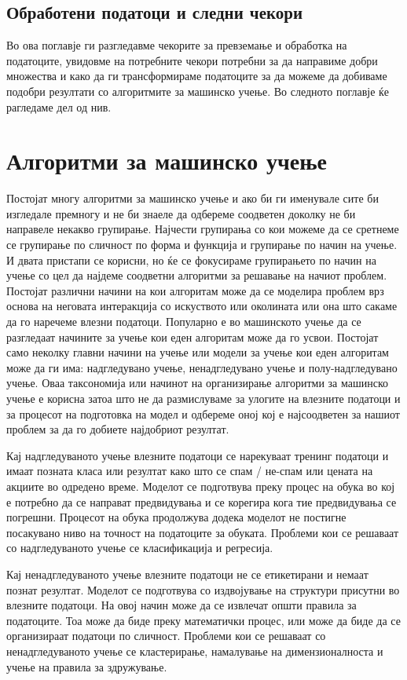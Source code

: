 \section{Обработени податоци и следни чекори}
Во ова поглавје ги разгледавме чекорите за превземање и обработка на податоците, увидовме на потребните чекори потребни за да направиме добри множества и како да ги трансформираме податоците за да можеме да добиваме подобри резултати со алгоритмите за машинско учење. Во следното поглавје ќе рагледаме дел од нив.    
\chapter{Алгоритми за машинско учење}
\label{sec:machine_learning}
Постојат многу алгоритми за машинско учење и ако би ги именувале сите би изгледале премногу и не би знаеле да одбереме соодветен доколку не би направеле некакво групирање. Најчести групирања со кои можеме да се сретнеме се групирање по сличност по форма и функција и групирање по начин на учење. И двата пристапи се корисни, но ќе се фокусираме групирањето по начин на учење со цел да најдеме соодветни алгоритми за решавање на начиот проблем. 
Постојат различни начини на кои алгоритам може да се моделира проблем врз основа на неговата интеракција со искуството или околината или она што сакаме да го наречеме влезни податоци.
Популарно е во машинското учење да се разгледаат начините за учење кои еден алгоритам може да го усвои.
Постојат само неколку главни начини на учење или модели за учење кои еден алгоритам може да ги има: надгледувано учење, ненадгледувано учење и полу-надгледувано учење.
Оваа таксономија или начинот на организирање алгоритми за машинско учење е корисна затоа што не да размислуваме за улогите на влезните податоци и за процесот на подготовка на модел и одбереме оној кој е најсоодветен за нашиот проблем за да го добиете најдобриот резултат.

Кај надгледуваното учење влезните податоци се нарекуваат тренинг податоци и имаат позната класа или резултат како што се спам / не-спам или цената на акциите во одредено време.
Моделот се подготвува преку процес на обука во кој е потребно да се направат предвидувања и се корегира кога тие предвидувања се погрешни. Процесот на обука продолжува додека моделот не постигне посакувано ниво на точност на податоците за обуката.
Проблеми кои се решаваат со надгледуваното учење се класификација и регресија.

Кај ненадгледуваното учење влезните податоци не се етикетирани и немаат познат резултат.
Моделот се подготвува со издвојување на структури присутни во влезните податоци. На овој начин може да се извлечат општи правила за податоците. Тоа може да биде преку математички процес, или може да биде да се организираат податоци по сличност.
Проблеми кои се решаваат со ненадгледуваното учење се кластерирање, намалување на димензионалноста и учење на правила за здружување.

